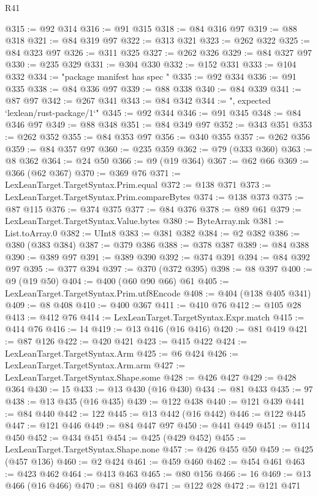 \begin{lexlean}{R41}
\begin{coremodule}
{{{{{{{{{{{{{{{{{{{{{{{{{{{{{{{{{{{{{{{{{{{{{{{{{{{{{{{{{{{{{{{{{{{{{{{{{{{{{{{{{{{{{{{@315 := @92 @314
@316 := @91 @315
@318 := @84 @316 @97
@319 := @88 @318
@321 := @84 @319 @97
@322 := @313 @321
@323 := @262 @322
@325 := @84 @323 @97
@326 := @311 @325
@327 := @262 @326
@329 := @84 @327 @97
@330 := @235 @329
@331 := @304 @330
@332 := @152 @331
@333 := @104 @332
@334 := "package manifest has spec "
@335 := @92 @334
@336 := @91 @335
@338 := @84 @336 @97
@339 := @88 @338
@340 := @84 @339
@341 := @87 @97
@342 := @267 @341
@343 := @84 @342
@344 := ", expected `lexlean/rust-package/1`"
@345 := @92 @344
@346 := @91 @345
@348 := @84 @346 @97
@349 := @88 @348
@351 := @84 @349 @97
@352 := @343 @351
@353 := @262 @352
@355 := @84 @353 @97
@356 := @340 @355
@357 := @262 @356
@359 := @84 @357 @97
@360 := @235 @359
@362 := @79 (@333 @360)
@363 := @8 @362
@364 := @24 @50
@366 := @9 (@19 @364)
@367 := @62 @66
@369 := @366 (@62 @367)
@370 := @369 @76
@371 := LexLeanTarget.TargetSyntax.Prim.equal
@372 := @138 @371
@373 := LexLeanTarget.TargetSyntax.Prim.compareBytes
@374 := @138 @373
@375 := @87 @115
@376 := @374 @375
@377 := @84 @376
@378 := @89 @61
@379 := LexLeanTarget.TargetSyntax.Value.bytes
@380 := ByteArray.mk
@381 := List.toArray.{0}
@382 := UInt8
@383 := @381 @382
@384 := @2 @382
@386 := @380 (@383 @384)
@387 := @379 @386
@388 := @378 @387
@389 := @84 @388
@390 := @389 @97
@391 := @389 @390
@392 := @374 @391
@394 := @84 @392 @97
@395 := @377 @394
@397 := @370 (@372 @395)
@398 := @8 @397
@400 := @9 (@19 @50)
@404 := @400 (@60 @90 @66) @61
@405 := LexLeanTarget.TargetSyntax.Prim.utf8Encode
@408 := @404 (@138 @405 @341)
@409 := @8 @408
@410 := @400 @367
@411 := @410 @76
@412 := @105 @28
@413 := @412 @76
@414 := LexLeanTarget.TargetSyntax.Expr.match
@415 := @414 @76
@416 := 14
@419 := @13 @416 (@16 @416)
@420 := @81 @419
@421 := @87 @126
@422 := @420 @421
@423 := @415 @422
@424 := LexLeanTarget.TargetSyntax.Arm
@425 := @6 @424
@426 := LexLeanTarget.TargetSyntax.Arm.arm
@427 := LexLeanTarget.TargetSyntax.Shape.some
@428 := @426 @427
@429 := @428 @364
@430 := 15
@433 := @13 @430 (@16 @430)
@434 := @81 @433
@435 := 97
@438 := @13 @435 (@16 @435)
@439 := @122 @438
@440 := @121 @439
@441 := @84 @440
@442 := 122
@445 := @13 @442 (@16 @442)
@446 := @122 @445
@447 := @121 @446
@449 := @84 @447 @97
@450 := @441 @449
@451 := @114 @450
@452 := @434 @451
@454 := @425 (@429 @452)
@455 := LexLeanTarget.TargetSyntax.Shape.none
@457 := @426 @455 @50
@459 := @425 (@457 @136)
@460 := @2 @424
@461 := @459 @460
@462 := @454 @461
@463 := @423 @462
@464 := @413 @463
@465 := @80 @156
@466 := 16
@469 := @13 @466 (@16 @466)
@470 := @81 @469
@471 := @122 @28
@472 := @121 @471
}}}}}}}}}}}}}}}}}}}}}}}}}}}}}}}}}}}}}}}}}}}}}}}}}}}}}}}}}}}}}}}}}}}}}}}}}}}}}}}}}}}}}}}
\end{coremodule}
\end{lexlean}
